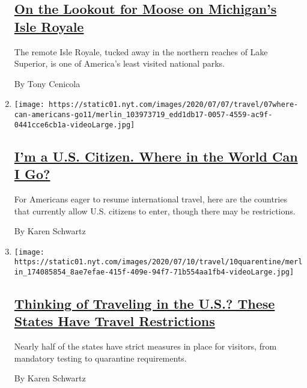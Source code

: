 \begin{enumerate}
{  \subsection{\texorpdfstring{\href{/2020/07/27/travel/moose-michigan-isle-royale.html}{On
  the Lookout for Moose on Michigan's Isle
  Royale}}{On the Lookout for Moose on Michigan's Isle Royale}}\label{on-the-lookout-for-moose-on-michigans-isle-royale}}

  The remote Isle Royale, tucked away in the northern reaches of Lake
  Superior, is one of America's least visited national parks.

  By Tony Cenicola
\item
  \texttt{[image: https://static01.nyt.com/images/2020/07/07/travel/07where-can-americans-go11/merlin\_103973719\_edd1db17-0057-4559-ac9f-0441cce6cb1a-videoLarge.jpg]}

  \hypertarget{im-a-us-citizen-where-in-the-world-can-i-go}{%
  \subsection{\texorpdfstring{\href{/2020/07/07/travel/american-travelers-restrictions-coronavirus.html}{I'm
  a U.S. Citizen. Where in the World Can I
  Go?}}{I'm a U.S. Citizen. Where in the World Can I Go?}}\label{im-a-us-citizen-where-in-the-world-can-i-go}}

  For Americans eager to resume international travel, here are the
  countries that currently allow U.S. citizens to enter, though there
  may be restrictions.

  By Karen Schwartz
\item
  \texttt{[image: https://static01.nyt.com/images/2020/07/10/travel/10quarentine/merlin\_174085854\_8ae7efae-415f-409e-94f7-71b554aa1fb4-videoLarge.jpg]}

  \hypertarget{thinking-of-traveling-in-the-us-these-states-have-travel-restrictions}{%
  \subsection{\texorpdfstring{\href{/2020/07/10/travel/state-travel-restrictions.html}{Thinking
  of Traveling in the U.S.? These States Have Travel
  Restrictions}}{Thinking of Traveling in the U.S.? These States Have Travel Restrictions}}\label{thinking-of-traveling-in-the-us-these-states-have-travel-restrictions}}

  Nearly half of the states have strict measures in place for visitors,
  from mandatory testing to quarantine requirements.

  By Karen Schwartz
\end{enumerate}


